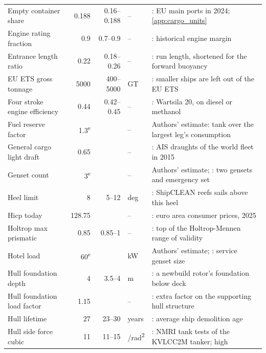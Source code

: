 \begin{longtable}{@{}>{\raggedright\arraybackslash}p{3.4cm}rr>{\raggedright\arraybackslash}p{1.4cm}>{\raggedright\arraybackslash}p{5.8cm}@{}}
Empty container share & \num{0.188} & \num{0.16}--\num{0.188} & -- & \citet{eurostat_mar_mg_am_cvh}: EU main ports in 2024; \cref{app:cargo_units} \\
Engine rating fraction & \num{0.9} & \num{0.7}--\num{0.9} & -- & \citet{man2011}: historical engine margin \\
Entrance length ratio & \num{0.22} & \num{0.18}--\num{0.26} & -- & \citet{holtrop1982}: run length, shortened for the forward buoyancy \\
EU ETS gross tonnage & \num{5000} & \num{400}--\num{5000} & GT & \citet[recital 30]{eu2023ets}: smaller ships are left out of the EU ETS \\
Four stroke engine efficiency & \num{0.44} & \num{0.42}--\num{0.45} & -- & \citet[p. 4]{wartsila2024w20}: Wartsila 20, on diesel or methanol \\
Fuel reserve factor & \num{1.3}\textsuperscript{e} &  & -- & Authors' estimate: tank over the largest leg's consumption \\
General cargo light draft & \num{0.65} &  & -- & \citet[Appendix J]{olmer2017}: AIS draughts of the world fleet in 2015 \\
Genset count & \num{3}\textsuperscript{e} &  & -- & Authors' estimate; \citet{damen2025cf3850}: two gensets and emergency set \\
Heel limit & \num{8} & \num{5}--\num{12} & deg & \citet{tillig2020}: ShipCLEAN reefs sails above this heel \\
Hicp today & \num{128.75} &  & -- & \citet{eurostat2026hicp}: euro area consumer prices, 2025 \\
Holtrop max prismatic & \num{0.85} & \num{0.85}--\num{1} & -- & \citet{ortigosa2009}: top of the Holtrop-Mennen range of validity \\
Hotel load & \num{60}\textsuperscript{e} &  & kW & Authors' estimate; \citet{damen2025cf3850}: service genset size \\
Hull foundation depth & \num{4} & \num{3.5}--\num{4} & m & \citet[p. 23]{wasp2023bpm}: a newbuild rotor's foundation below deck \\
Hull foundation load factor & \num{1.15} &  & -- & \citet[Sec 8, 4.3.1]{bv2026nr206}: extra factor on the supporting hull structure \\
Hull lifetime & \num{27} & \num{23}--\num{30} & years & \citet{breakwave2025demolition}: average ship demolition age \\
Hull side force cubic & \num{11} & \num{11}--\num{15} & 1/rad\textsuperscript{2} & \citet{toxopeus2011}: NMRI tank tests of the KVLCC2M tanker; \citet{vanderkolk2021} high \\

\end{longtable}
